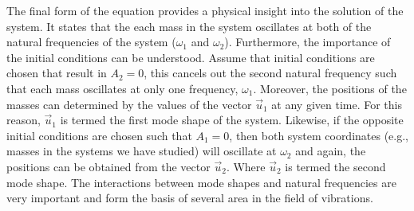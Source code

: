 \documentclass[12pt,letter]{article}
\numberwithin{ex}{section} %
\numberwithin{re}{section} %
\begin{document}
The final form of the equation provides a physical insight into the solution of the system. It states that the each mass in the system oscillates at both of the natural frequencies of the system ($\omega_1$ and $\omega_2$). Furthermore, the importance of the  initial conditions can be understood. Assume that initial conditions are chosen that result in $A_2=0$, this cancels out the second natural frequency such that each mass oscillates at only one frequency,  $\omega_1$. Moreover, the positions of the masses can determined by the values of the vector $\vec{u}_1$ at any given time. For this reason,  $\vec{u}_1$ is termed the first mode shape of the system. Likewise, if the opposite initial conditions are chosen such that  $A_1=0$, then both system coordinates (e.g., masses in the systems we have studied) will oscillate at $\omega_2$ and again, the positions can be obtained from the vector $\vec{u}_2$. Where $\vec{u}_2$ is termed the second mode shape. The interactions between mode shapes and natural frequencies are very important and form the basis of several area in the field of vibrations.
\end{document}
